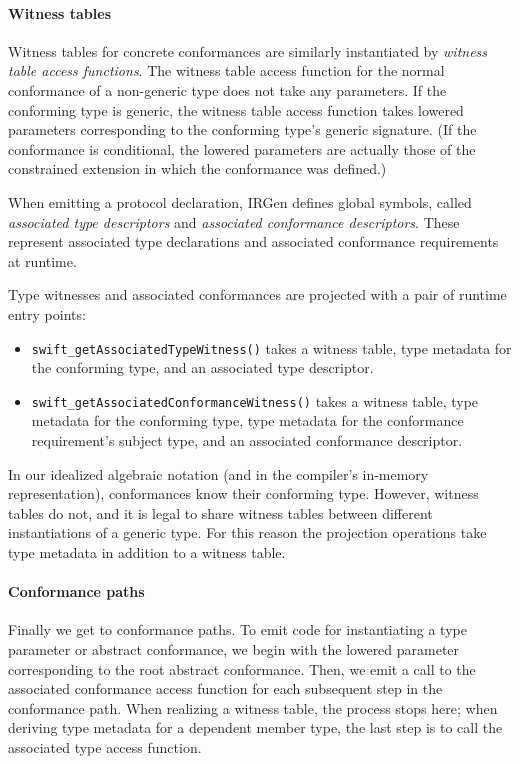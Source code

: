 \documentclass[../generics]{subfiles}
\begin{document}
\paragraph{Witness tables}
Witness tables for concrete conformances are similarly instantiated by \emph{witness table access functions}. The witness table access function for the normal conformance of a non-generic type does not take any parameters. If the conforming type is generic, the witness table access function takes lowered parameters corresponding to the conforming type's generic signature. (If the conformance is conditional, the lowered parameters are actually those of the constrained extension in which the conformance was defined.)

When emitting a protocol declaration, IRGen defines global symbols, called \emph{associated type descriptors} and \emph{associated conformance descriptors}. These represent associated type declarations and associated conformance requirements at runtime.

Type witnesses and associated conformances are projected with a pair of runtime entry points:
\begin{itemize}
\item \verb|swift_getAssociatedTypeWitness()| takes a witness table, type metadata for the conforming type, and an associated type descriptor.
\item \verb|swift_getAssociatedConformanceWitness()| takes a witness table, type metadata for the conforming type, type metadata for the conformance requirement's subject type, and an associated conformance descriptor.
\end{itemize}
In our idealized algebraic notation (and in the compiler's in-memory representation), conformances know their conforming type. However, witness tables do not, and it is legal to share witness tables between different instantiations of a generic type. For this reason the projection operations take type metadata in addition to a witness table.

\paragraph{Conformance paths}
Finally we get to conformance paths. To emit code for instantiating a type parameter or abstract conformance, we begin with the lowered parameter corresponding to the root abstract conformance. Then, we emit a call to the associated conformance access function for each subsequent step in the conformance path. When realizing a witness table, the process stops here; when deriving type metadata for a dependent member type, the last step is to call the associated type access function.
\end{document}
